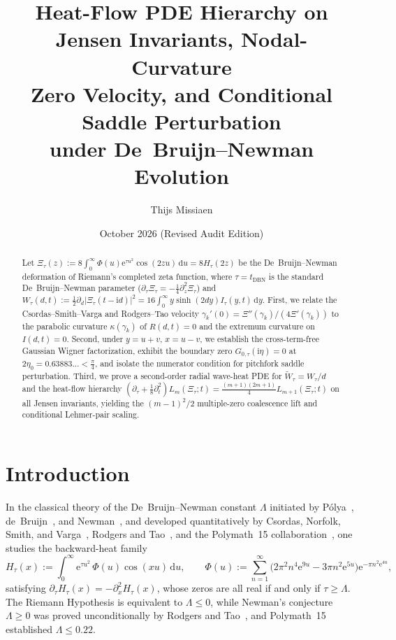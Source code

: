 \documentclass[11pt,reqno]{amsart}
\title[Heat-Flow Jensen PDE Hierarchy and De Bruijn--Newman Evolution]{Heat-Flow PDE Hierarchy on Jensen Invariants, Nodal-Curvature\\ Zero Velocity, and Conditional Saddle Perturbation\\ under De~Bruijn--Newman Evolution}
\author{Thijs Missiaen}
\date{October 2026 (Revised Audit Edition)}
\theoremstyle{plain}
\theoremstyle{definition}
\theoremstyle{remark}
\numberwithin{equation}{section}
\newcommand{\dd}{\,\mathrm{d}}
\newcommand{\ii}{\mathrm{i}}
\newcommand{\ee}{\mathrm{e}}
\begin{document}
\begin{abstract}
Let $\Xi_\tau(z) := 8\int_0^\infty \Phi(u)\ee^{\tau u^2}\cos(2zu)\dd u = 8H_\tau(2z)$ be the De~Bruijn--Newman deformation of Riemann's completed zeta function, where $\tau = t_{\mathrm{DBN}}$ is the standard De~Bruijn--Newman parameter ($\partial_\tau\Xi_\tau = -\frac{1}{4}\partial_z^2\Xi_\tau$) and $W_\tau(d,t) := \frac{1}{2}\partial_d\lvert\Xi_\tau(t - \ii d)\rvert^2 = 16\int_0^\infty y\sinh(2dy)I_\tau(y,t)\dd y$. First, we relate the Csordas--Smith--Varga and Rodgers--Tao velocity $\gamma_k'(0) = \Xi''(\gamma_k)/(4\Xi'(\gamma_k))$ to the parabolic curvature $\kappa(\gamma_k)$ of $R(d,t) = 0$ and the extremum curvature on $I(d,t) = 0$. Second, under $y = u + v$, $x = u - v$, we establish the cross-term-free Gaussian Wigner factorization, exhibit the boundary zero $G_{0,\tau}(\ii\eta) = 0$ at $2\eta_0 = 0.63883\dots < \frac{\pi}{4}$, and isolate the numerator condition for pitchfork saddle perturbation. Third, we prove a second-order radial wave-heat PDE for $\widetilde{W}_\tau = W_\tau/d$ and the heat-flow hierarchy $(\partial_\tau + \frac{1}{8}\partial_t^2)L_m(\Xi_\tau; t) = \frac{(m+1)(2m+1)}{4}L_{m+1}(\Xi_\tau; t)$ on all Jensen invariants, yielding the $(m-1)^2/2$ multiple-zero coalescence lift and conditional Lehmer-pair scaling.
\end{abstract}

\maketitle

\section{Introduction}\label{sec:intro}

In the classical theory of the De~Bruijn--Newman constant $\Lambda$ initiated by P\'olya~\cite{polya1926}, de~Bruijn~\cite{debruijn1950}, and Newman~\cite{newman1976}, and developed quantitatively by Csordas, Norfolk, Smith, and Varga~\cite{csordas1986,csordas1988,csordas1994}, Rodgers and Tao~\cite{rodgerstao2020}, and the Polymath~15 collaboration~\cite{polymath2019}, one studies the backward-heat family
\begin{equation}\label{eq:classical_Ht}
H_\tau(x) := \int_0^{\infty} \ee^{\tau u^2}\,\Phi(u)\cos(xu)\dd u, \qquad \Phi(u) := \sum_{n=1}^{\infty} \bigl(2\pi^2 n^4\ee^{9u} - 3\pi n^2\ee^{5u}\bigr)\ee^{-\pi n^2\ee^{4u}},
\end{equation}
satisfying $\partial_\tau H_\tau(x) = -\partial_x^2 H_\tau(x)$, whose zeros are all real if and only if $\tau \ge \Lambda$. The Riemann Hypothesis is equivalent to $\Lambda \le 0$, while Newman's conjecture $\Lambda \ge 0$ was proved unconditionally by Rodgers and Tao~\cite{rodgerstao2020}, and Polymath~15~\cite{polymath2019} established $\Lambda \le 0.22$.
\end{document}
